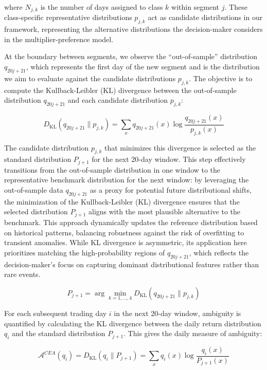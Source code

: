 \documentclass[preprint,12pt,authoryear]{elsarticle}
\begin{document}
where \(N_{j,k}\) is the number of days assigned to class \(k\) within segment \(j\). These class-specific representative distributions \(p_{j,k}\) act as candidate distributions in our framework, representing the alternative distributions the decision-maker considers in the multiplier-preference model.

At the boundary between segments, we observe the ``out-of-sample'' distribution \(q_{20j+21}\), which represents the first day of the new segment and is the distribution we aim to evaluate against the candidate distributions \(p_{j,k}\). The objective is to compute the Kullback-Leibler (KL) divergence between the out-of-sample distribution \(q_{20j+21}\) and each candidate distribution \(p_{j,k}\):

\begin{equation*}
D_{\mathrm{KL}}(q_{20j+21} \parallel p_{j,k}) = \sum_{x} q_{20j+21}(x) \log \frac{q_{20j+21}(x)}{p_{j,k}(x)}
\end{equation*}

The candidate distribution $p_{j,k}$ that minimizes this divergence is selected as the standard distribution $P_{j+1}$ for the next 20-day window. This step effectively transitions from the out-of-sample distribution in one window to the representative benchmark distribution for the next window:
by leveraging the out-of-sample data $q_{20j+21}$ as a proxy for potential future distributional shifts, the minimization of the Kullback-Leibler (KL) divergence ensures that the selected distribution $P_{j+1}$ aligns with the most plausible alternative to the benchmark. This approach dynamically updates the reference distribution based on historical patterns, balancing robustness against the risk of overfitting to transient anomalies. While KL divergence is asymmetric, its application here prioritizes matching the high-probability regions of $q_{20j+21}$, which reflects the decision-maker's focus on capturing dominant distributional features rather than rare events.

\begin{equation*}
P_{j+1} = \arg\min_{k=1,\dots,4} D_{\mathrm{KL}}(q_{20j+21} \parallel p_{j,k})
\end{equation*}

For each subsequent trading day \(i\) in the next 20-day window, ambiguity is quantified by calculating the KL divergence between the daily return distribution \(q_i\) and the standard distribution \(P_{j+1}\). This gives the daily measure of ambiguity:

\begin{equation*}
\mathcal{A}^{CEA}(q_i) =  D_{\mathrm{KL}}(q_i \parallel P_{j+1}) = \sum_{x} q_i(x) \log \frac{q_i(x)}{P_{j+1}(x)}
\end{equation*}
\end{document}
